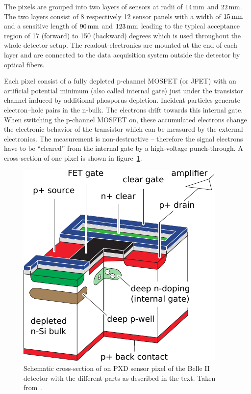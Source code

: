 The pixels are grouped into two layers of sensors at radii of $\unit[14]{mm}$ and $\unit[22]{mm}$. The two layers consist of 8 respectively 12 sensor panels with a width of $\unit[15]{mm}$ and a sensitive length of $\unit[90]{mm}$ and $\unit[123]{mm}$ leading to the typical acceptance region of 17 (forward) to 150 (backward) degrees which is used throughout the whole detector setup. The readout-electronics are mounted at the end of each layer and are connected to the data acquisition system outside the detector by optical fibers.

Each pixel consist of a fully depleted p-channel MOSFET (or JFET) with an artificial potential minimum (also called internal gate) just under the transistor channel induced by additional phosporus depletion. Incident particles generate electron--hole pairs in the n-bulk. The electrons drift towards this internal gate. When switching the p-channel MOSFET on, these accumulated electrons change the electronic behavior of the transistor which can be measured by the external electronics. The measurement is non-destructive -- therefore the signal electrons have to be ``cleared'' from the internal gate by a high-voltage punch-through. A cross-section of one pixel is shown in figure~\ref{fig-pxd-schema}.

\begin{figure}
  \centering
  \includegraphics[width=0.6\linewidth]{figures/experimental_setup/pxd.pdf}
  \caption[Cross-section of a PXD sensor]{Schematic cross-section of on PXD sensor pixel of the Belle II detector with the different parts as described in the text. Taken from~\cite{tdr}.}
  \label{fig-pxd-schema}
\end{figure}


